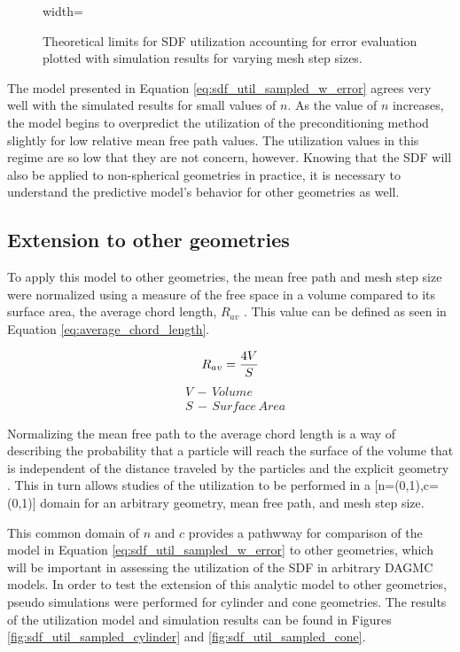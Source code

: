 \begin{figure}[H]
  \centering
  {width=\textwidth}
  \caption{Theoretical limits for SDF utilization accounting for error
    evaluation plotted with simulation results for varying mesh step sizes.}
  \label{fig:sdf_util_sampled_distance_w_error}
\end{figure}

The model presented in Equation \ref{eq:sdf_util_sampled_w_error} agrees very
well with the simulated results for small values of $n$. As the value of $n$
increases, the model begins to overpredict the utilization of the
preconditioning method slightly for low relative mean free path values. The
utilization values in this regime are so low that they are not concern,
however. Knowing that the SDF will also be applied to non-spherical geometries
in practice, it is necessary to understand the predictive model's behavior for
other geometries as well.

\subsection{Extension to other geometries}\label{sec:sdf_other_geoms}

To apply this model to other geometries, the mean free path and mesh step size
were normalized using a measure of the free space in a volume compared to its
surface area, the average chord length, $R_{av}$ \cite{Wigner_1981}.  This value
can be defined as seen in Equation \ref{eq:average_chord_length}.

\begin{equation}
\centering
 R_{av} = \frac{4V}{S}
 \label{eq:average_chord_length}
\end{equation}
\begin{align*}
 &V \, - \, Volume \\
 &S \, - \, Surface \, Area
\end{align*}

Normalizing the mean free path to the average chord length is a way of
describing the probability that a particle will reach the surface of the volume
that is independent of the distance traveled by the particles and the explicit
geometry \cite{Mazzolo_2014}. This in turn allows studies of the utilization to
be performed in a [n=(0,1),c=(0,1)] domain for an arbitrary geometry, mean free
path, and mesh step size.

This common domain of $n$ and $c$ provides a pathwway for comparison of the
model in Equation \ref{eq:sdf_util_sampled_w_error} to other geometries, which
will be important in assessing the utilization of the SDF in arbitrary DAGMC
models. In order to test the extension of this analytic model to other
geometries, pseudo simulations were performed for cylinder and cone
geometries. The results of the utilization model and simulation results can be
found in Figures \ref{fig:sdf_util_sampled_cylinder} and
\ref{fig:sdf_util_sampled_cone}.

